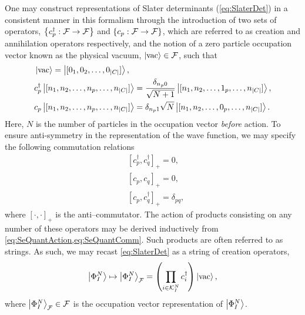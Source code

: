 One may construct representations of Slater determinants (\cref{eq:SlaterDet}) in a consistent manner in this formalism through
the introduction of two sets of operators, $\left \lbrace  c_p^\dagger : \mathcal{F} \rightarrow \mathcal{F} \right\rbrace$ and $\left \lbrace  c_p : \mathcal{F} \rightarrow \mathcal{F}  \right\rbrace$, which are referred to as creation and annihilation operators 
respectively, and the notion of a zero particle occupation vector known as the physical vacuum, $\left\vert \mathrm{vac} \right\rangle \in \mathcal{F}$, such that
\begin{subequations}
  \label{eq:SeQuantAction}
\begin{align}
  &\left\vert \mathrm{vac} \right\rangle = \left\vert [0_1, 0_2, \ldots, 0_{\vert C \vert}] \right\rangle, \\
  &c_p^\dagger \left\vert [n_1, n_2, \ldots, n_p, \ldots, n_{\vert C \vert}] \right\rangle = \frac{\delta_{n_p0}}{\sqrt{N+1}} \left\vert [n_1, n_2, \ldots, 1_p, \ldots, n_{\vert C \vert}] \right\rangle,\\
  &c_p \left\vert [n_1, n_2, \ldots, n_p, \ldots, n_{\vert C \vert}] \right\rangle = {\delta_{n_p1}}{\sqrt{N}} \left\vert [n_1, n_2, \ldots, 0_p, \ldots, n_{\vert C \vert}] \right\rangle.
\end{align}
\end{subequations}
Here, $N$ is the number of particles in the occupation vector \emph{before} action. To ensure anti-symmetry in the representation of
the wave function, we may specify the following commutation relations
\begin{subequations}
  \label{eq:SeQuantComm}
\begin{align}
  &[c_p^\dagger, c_q^\dagger]_+ = 0,\\
  &[c_p, c_q]_+ = 0,\\
  &[c_p, c_q^\dagger]_+ = \delta_{pq},
\end{align}
\end{subequations}
where $[\cdot,\cdot]_+$ is the anti--commutator. The action of products consisting on any number of these 
operators may be derived inductively from \cref{eq:SeQuantAction,eq:SeQuantComm}. Such products are often referred to as
strings. As such, we may recast \cref{eq:SlaterDet} as a string of creation operators,
\begin{equation}
  \label{eq:SeQuantSlaterDet}
  \left\vert \Phi^N_I \right\rangle \mapsto \left\vert \Phi^N_I \right\rangle_{\mathcal{F}}  = \left(\prod_{i \in \mathcal{K}^N_I} c_i^\dagger\right) \left\vert \mathrm{vac} \right\rangle,
\end{equation}
where $\left\vert \Phi^N_I \right\rangle_{\mathcal{F}} \in \mathcal{F}$ is the occupation vector representation of $\left\vert \Phi^N_I \right\rangle$.



